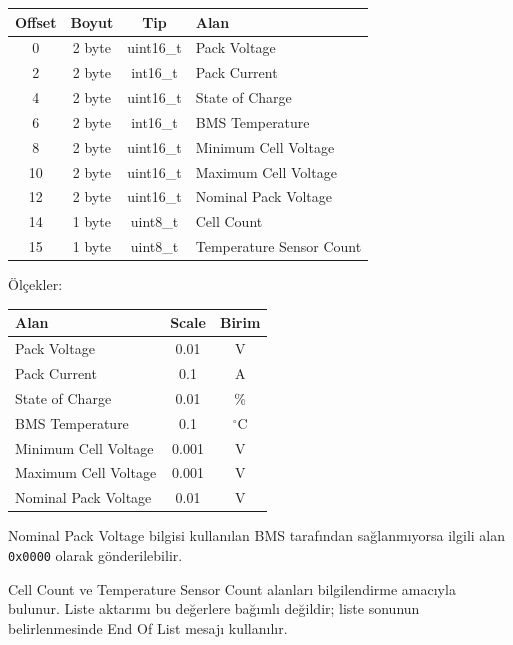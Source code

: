 \documentclass[a4paper,10pt]{article}
\begin{document}
\begin{center}
\begin{tabular}{c c c l}
\toprule
\textbf{Offset} &
\textbf{Boyut} &
\textbf{Tip} &
\textbf{Alan} \\
\midrule

0  & 2 byte & uint16\_t & Pack Voltage \\
2  & 2 byte & int16\_t  & Pack Current \\
4  & 2 byte & uint16\_t & State of Charge \\
6  & 2 byte & int16\_t  & BMS Temperature \\
8  & 2 byte & uint16\_t & Minimum Cell Voltage \\
10 & 2 byte & uint16\_t & Maximum Cell Voltage \\
12 & 2 byte & uint16\_t & Nominal Pack Voltage \\
14 & 1 byte & uint8\_t  & Cell Count \\
15 & 1 byte & uint8\_t  & Temperature Sensor Count \\

\bottomrule
\end{tabular}
\end{center}

Ölçekler:

\begin{center}
\begin{tabular}{l c c}
\toprule
\textbf{Alan} & \textbf{Scale} & \textbf{Birim} \\
\midrule

Pack Voltage          & 0.01 & V \\
Pack Current          & 0.1  & A \\
State of Charge       & 0.01 & \% \\
BMS Temperature       & 0.1  & $^\circ$C \\
Minimum Cell Voltage  & 0.001 & V \\
Maximum Cell Voltage  & 0.001 & V \\
Nominal Pack Voltage  & 0.01 & V \\

\bottomrule
\end{tabular}
\end{center}

Nominal Pack Voltage bilgisi kullanılan BMS tarafından sağlanmıyorsa
ilgili alan \texttt{0x0000} olarak gönderilebilir.

Cell Count ve Temperature Sensor Count alanları bilgilendirme amacıyla
bulunur. Liste aktarımı bu değerlere bağımlı değildir; liste sonunun
belirlenmesinde End Of List mesajı kullanılır.
\end{document}
